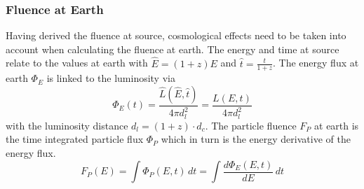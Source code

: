 \subsubsection{Fluence at Earth}
\label{sec:FatEarth}
Having derived the fluence at source, cosmological effects need to be taken
into account when calculating the fluence at earth. The energy and time
at source relate to the values at earth with $\hat{E} = (1 + z) E$ and 
$\hat{t} = \frac{t}{1+z}$. 
The energy flux at earth $\Phi_E$ is linked to the luminosity via
\begin{equation}
\label{eq:PhiEL}
 \Phi_E (t) = \frac{\hat{L} \left(\hat{E}, \hat{t} \right)}{4 \pi d_l^2} =
\frac{L \left(E, t \right)}{4 \pi d_l^2}
\end{equation}
with the luminosity distance $d_l=(1+z) \cdot d_c$.
The particle fluence $F_P$ at earth is the time integrated particle flux
$\Phi_P$ which in turn is the energy derivative of the energy flux.
\begin{equation}
F_P(E) = \int \Phi_P(E,t)\, dt = \int
\frac{d\Phi_E(E,t)}{dE}\,dt 
\label{eqn:fluence}
\end{equation}

